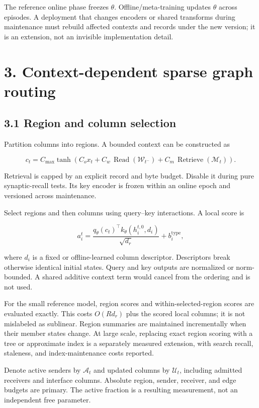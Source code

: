 \documentclass[
  11pt,
  a4paper,
]{article}
\begin{document}
The reference online phase freezes \(\theta\). Offline/meta-training
updates \(\theta\) across episodes. A deployment that changes encoders
or shared transforms during maintenance must rebuild affected contexts
and records under the new version; it is an extension, not an invisible
implementation detail.

\section{3. Context-dependent sparse graph
routing}\label{context-dependent-sparse-graph-routing}

\subsection{3.1 Region and column
selection}\label{region-and-column-selection}

Partition columns into regions. A bounded context can be constructed as

\[
c_t=C_{\max}\tanh\!\left(
C_o x_t+C_w\,\operatorname{Read}(\mathcal W_{t^-})
+C_m\,\operatorname{Retrieve}(\mathcal M_t)
\right).
\tag{5}
\]

Retrieval is capped by an explicit record and byte budget. Disable it
during pure synaptic-recall tests. Its key encoder is frozen within an
online epoch and versioned across maintenance.

Select regions and then columns using query--key interactions. A local
score is

\[
a_i^t=
\frac{q_\theta(c_t)^\top k_\theta(h_i^{t,0},d_i)}{\sqrt{d_r}}
+b_i^{\mathrm{type}},
\tag{6}
\]

where \(d_i\) is a fixed or offline-learned column descriptor.
Descriptors break otherwise identical initial states. Query and key
outputs are normalized or norm-bounded. A shared additive context term
would cancel from the ordering and is not used.

For the small reference model, region scores and within-selected-region
scores are evaluated exactly. This costs \(O(Rd_r)\) plus the scored
local columns; it is not mislabeled as sublinear. Region summaries are
maintained incrementally when their member states change. At large
scale, replacing exact region scoring with a tree or approximate index
is a separately measured extension, with search recall, staleness, and
index-maintenance costs reported.

Denote active senders by \(\mathcal A_t\) and updated columns by
\(\mathcal U_t\), including admitted receivers and interface columns.
Absolute region, sender, receiver, and edge budgets are primary. The
active fraction is a resulting measurement, not an independent free
parameter.
\end{document}
